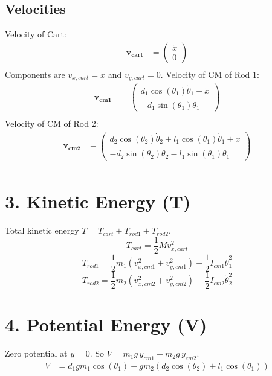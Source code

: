\documentclass{article}%
\begin{document}
\subsection{Velocities}%
\label{subsec:Velocities}%
Velocity of Cart:%
\begin{align*}%
\mathbf{v_{cart}} &= \displaystyle \begin{pmatrix}\dot{x}\\0\end{pmatrix} \\%
\end{align*}%
Components are $v_{x,cart} = \dot{x}$ and $v_{y,cart} = 0$.%
Velocity of CM of Rod 1:%
\begin{align*}%
\mathbf{v_{cm1}} &= \displaystyle \begin{pmatrix}d_{1} \cos(\theta_1 ) \dot{\theta}_{1} + \dot{x}\\- d_{1} \sin(\theta_1 ) \dot{\theta}_{1}\end{pmatrix} \\%
\end{align*}%
Velocity of CM of Rod 2:%
\begin{align*}%
\mathbf{v_{cm2}} &= \displaystyle \begin{pmatrix}d_{2} \cos(\theta_2 ) \dot{\theta}_{2} + l_{1} \cos(\theta_1 ) \dot{\theta}_{1} + \dot{x}\\- d_{2} \sin(\theta_2 ) \dot{\theta}_{2} - l_{1} \sin(\theta_1 ) \dot{\theta}_{1}\end{pmatrix} \\%
\end{align*}

%
\section{3. Kinetic Energy (T)}%
\label{sec:3.KineticEnergy(T)}%
Total kinetic energy $T = T_{cart} + T_{rod1} + T_{rod2}$.%
$$ T_{cart} = \frac{1}{2} M v_{x,cart}^2 $$%
$$ T_{rod1} = \frac{1}{2} m_1 (v_{x,cm1}^2 + v_{y,cm1}^2) + \frac{1}{2} I_{cm1} \dot{\theta}_1^2 $$%
$$ T_{rod2} = \frac{1}{2} m_2 (v_{x,cm2}^2 + v_{y,cm2}^2) + \frac{1}{2} I_{cm2} \dot{\theta}_2^2 $$

%
\section{4. Potential Energy (V)}%
\label{sec:4.PotentialEnergy(V)}%
Zero potential at $y=0$. So $V = m_1 g\,y_{cm1} + m_2 g\,y_{cm2}$.%
\begin{align*}%
V &= \displaystyle d_{1} g m_{1} \cos(\theta_1 ) + g m_{2} \left(d_{2} \cos(\theta_2 ) + l_{1} \cos(\theta_1 )\right) \\%
\end{align*}
\end{document}
